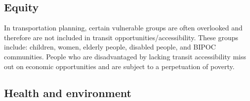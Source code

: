 \documentclass{article}
\begin{document}
    \subsection{Equity}
    \begin{outline}
        \1 In transportation planning, certain vulnerable groups are often overlooked and therefore are not included in transit opportunities/accessibility. These groups include: children, women, elderly people, disabled people, and BIPOC communities. 
        \1 People who are disadvantaged by lacking transit accessibility miss out on economic opportunities and are subject to a perpetuation of poverty. 
    \end{outline}
    \subsection{Health and environment}
    \begin{outline}
        \1 
    \end{outline}
\end{document}
